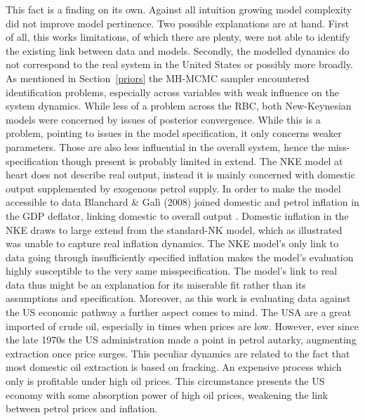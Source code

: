 \documentclass[12pt,a4paper,english]{article} %
\begin{document}
	This fact is a finding on its own. Against all intuition growing model complexity did not improve model pertinence. Two possible explanations are at hand. First of all, this works limitations, of which there are plenty, were not able to identify the existing link between data and models. Secondly, the modelled dynamics do not correspond to the real system in the United States or possibly more broadly. 
	As mentioned in Section~\ref{priors} the MH-MCMC sampler encountered identification problems, especially across variables with weak influence on the system dynamics. While less of a problem across the RBC, both New-Keynesian models were concerned by issues of posterior convergence. While this is a problem, pointing to issues in the model specification, it only concerns weaker parameters. Those are also less influential in the overall system, hence the miss-specification though present is probably limited in extend.
	The NKE model at heart does not describe real output, instead it is mainly concerned with domestic output supplemented by exogenous petrol supply. In order to make the model accessible to data Blanchard \& Galì (2008) joined domestic and petrol inflation in the GDP deflator, linking domestic to overall output \cite{blanchard_macroeconomic_2007}. Domestic inflation in the NKE draws to large extend from the standard-NK model, which as illustrated was unable to capture real inflation dynamics. The NKE model's only link to data going through insufficiently specified inflation makes the model's evaluation highly susceptible to the very same misspecification. The model's link to real data thus might be an explanation for its miserable fit rather than its assumptions and specification.
	Moreover, as this work is evaluating data against the US economic pathway a further aspect comes to mind. The USA are a great imported of crude oil, especially in times when prices are low. However, ever since the late 1970s the US administration made a point in petrol autarky, augmenting extraction once price surges. This peculiar dynamics are related to the fact that most domestic oil extraction is based on fracking. An expensive process which only is profitable under high oil prices. This circumstance presents the US economy with some absorption power of high oil prices, weakening the link between petrol prices and inflation. 
	
\end{document}
